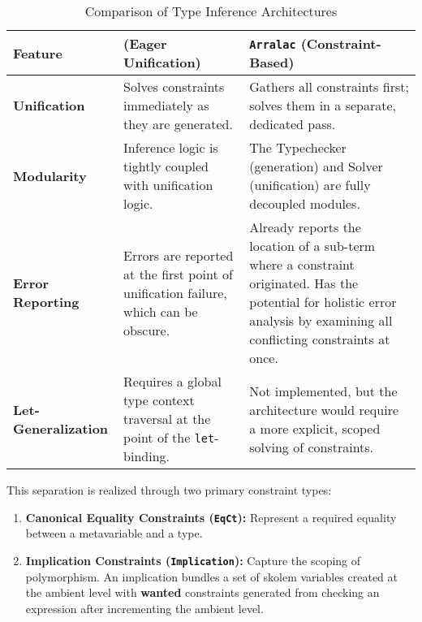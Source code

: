 \begin{table}[h!]
    \centering
    \small
    \caption{Comparison of Type Inference Architectures}
    \label{tab:arch-comparison}
    \begin{tabular}{p{} p{} p{}}
        \toprule
        \textbf{Feature}            & \textbf{\cite{jones-practical-2007} (Eager Unification)}                             & \textbf{\texttt{Arralac} (Constraint-Based)}                                                                                                                              \\
        \midrule
        \textbf{Unification}        & Solves constraints immediately as they are generated.                                & Gathers all constraints first; solves them in a separate, dedicated pass.                                                                                                 \\
        \textbf{Modularity}         & Inference logic is tightly coupled with unification logic.                           & The Typechecker (generation) and Solver (unification) are fully decoupled modules.                                                                                        \\
        \textbf{Error Reporting}    & Errors are reported at the first point of unification failure, which can be obscure. & Already reports the location of a sub-term where a constraint originated. Has the potential for holistic error analysis by examining all conflicting constraints at once. \\
        \textbf{Let-Generalization} & Requires a global type context traversal at the point of the \texttt{let}-binding.   & Not implemented, but the architecture would require a more explicit, scoped solving of constraints.                                                                       \\
        \bottomrule
    \end{tabular}
\end{table}

\newpage
This separation is realized through two primary constraint types:
\begin{enumerate}
    \item \textbf{Canonical Equality Constraints (\texttt{EqCt}):} Represent a required equality between a metavariable and a type.
    \item \textbf{Implication Constraints (\texttt{Implication}):} Capture the scoping of polymorphism. An implication bundles a set of skolem variables created at the ambient level with \textbf{wanted} \cite{wits-type-inference-using-constraints} constraints generated from checking an expression after incrementing the ambient level.
\end{enumerate}


